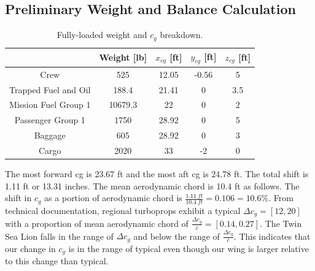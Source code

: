 \documentclass[conf]{new-aiaa}
\begin{document}
\subsection{Preliminary Weight and Balance Calculation}

\begin{table}[H]
\centering
\label{tab:weight and cg fully loaded}
\caption{Fully-loaded weight and $c_g$ breakdown.}
\begin{tabular}{|c|c|c|c|c|}\hline
						& Weight [lb] & $x_{cg}$ [ft] & $y_{cg}$ [ft] & $z_{cg}$ [ft]\\ \hline
Crew 					& 525 & 12.05 & -0.56 & 5\\ \hline
Trapped Fuel and Oil 	& 188.4 & 21.41 & 0 & 3.5\\ \hline
Mission Fuel Group 1 	& 10679.3 & 22 & 0 & 2\\ \hline
Passenger Group 1 		& 1750 & 28.92 & 0 & 5\\ \hline
Baggage 				& 605 & 28.92 & 0 & 3\\ \hline
Cargo 					& 2020 & 33 & -2 & 0\\ \hline

\end{tabular}

\end{table}

The most forward cg is 23.67 ft and the most aft cg is 24.78 ft. The total shift is 1.11 ft or 13.31 inches. The mean aerodynamic chord is 10.4 ft as follows\cite{aircraft dynamics}. The shift in $c_g$ as a portion of aerodynamic chord is $\frac{1.11\ ft}{10.4\ ft}=0.106=10.6\%$. From technical documentation, \cite{roskam 3} regional turboprops exhibit a typical $\Delta c_g=[12,20]$ with a proportion of mean aerodynamic chord of $\frac{\Delta c_g}{\bar{c}}=[0.14,0.27]$. The Twin Sea Lion falls in the range of $\Delta c_g$ and below the range of $\frac{\Delta c_g}{\bar{c}}$. This indicates that our change in $c_g$ is in the range of typical even though our wing is larger relative to this change than typical. 
\end{document}

